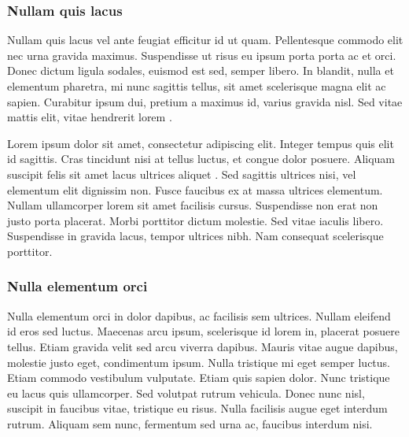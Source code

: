 \subsubsection{Nullam quis lacus}

Nullam quis lacus vel ante feugiat efficitur id ut quam. Pellentesque commodo elit nec urna gravida maximus. Suspendisse ut risus eu ipsum porta porta ac et orci. Donec dictum ligula sodales, euismod est sed, semper libero. In blandit, nulla et elementum pharetra, mi nunc sagittis tellus, sit amet scelerisque magna elit ac sapien. Curabitur ipsum dui, pretium a maximus id, varius gravida nisl. Sed vitae mattis elit, vitae hendrerit lorem \cite{ESP32_DATASHEET, ESP32_HARDWARE_DESIGN_GUIDELINES, ESP32_TECHNICAL_REFERENCE_MANUAL}. 

Lorem ipsum dolor sit amet, consectetur adipiscing elit. Integer tempus quis elit id sagittis. Cras tincidunt nisi at tellus luctus, et congue dolor posuere. Aliquam suscipit felis sit amet lacus ultrices aliquet \cite{ESP32_PROGRAMMING}. Sed sagittis ultrices nisi, vel elementum elit dignissim non. Fusce faucibus ex at massa ultrices elementum. Nullam ullamcorper lorem sit amet facilisis cursus. Suspendisse non erat non justo porta placerat. Morbi porttitor dictum molestie. Sed vitae iaculis libero. Suspendisse in gravida lacus, tempor ultrices nibh. Nam consequat scelerisque porttitor. 

\subsubsection{Nulla elementum orci}

Nulla elementum orci in dolor dapibus, ac facilisis sem ultrices. Nullam eleifend id eros sed luctus. Maecenas arcu ipsum, scelerisque id lorem in, placerat posuere tellus. Etiam gravida velit sed arcu viverra dapibus. Mauris vitae augue dapibus, molestie justo eget, condimentum ipsum. Nulla tristique mi eget semper luctus. Etiam commodo vestibulum vulputate. Etiam quis sapien dolor. Nunc tristique eu lacus quis ullamcorper. Sed volutpat rutrum vehicula. Donec nunc nisl, suscipit in faucibus vitae, tristique eu risus. Nulla facilisis augue eget interdum rutrum. Aliquam sem nunc, fermentum sed urna ac, faucibus interdum nisi.

